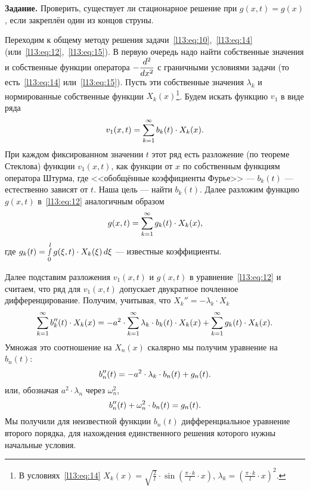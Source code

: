 \noindent\textbf{Задание.} Проверить, существует ли стационарное решение при $g(x,t)=g(x)$, если закреплён один из концов струны.
\vspace{0.2cm}

Переходим к общему методу решения задачи~\eqref{l13:eq:10},~\eqref{l13:eq:14} (или~\eqref{l13:eq:12},~\eqref{l13:eq:15}). В первую очередь надо найти собственные значения и собственные функции оператора $\displaystyle-\frac{d^2}{dx^2}$ с граничными условиями задачи (то есть~\eqref{l13:eq:14} или~\eqref{l13:eq:15}). Пусть эти собственные значения $\lambda_k$ и нормированные собственные функции $X_k(x)$\footnote{В условиях~\eqref{l13:eq:14} $\displaystyle X_k(x)=\sqrt{\frac{2}{l}}\cdot\sin\left(\frac{\pi\cdot k}{l}\cdot x\right)$, $\displaystyle\lambda_k=\left(\frac{\pi\cdot k}{l}\cdot x\right)^2$.}. Будем искать функцию $v_1$ в виде ряда
\begin{equation*}
	\hfill v_1(x,t)=\sum\limits_{k=1}^{\infty}b_k(t)\cdot X_k(x).\hfill
\end{equation*}
При каждом фиксированном значении $t$ этот ряд есть разложение (по теореме Стеклова) функции $v_1(x,t)$, как функции от $x$ по собственным функциям оператора Штурма, где <<обобщённые коэффициенты Фурье>> --- $b_k(t)$ --- естественно зависят от $t$. Наша цель --- найти $b_k(t)$. Далее разложим функцию $g(x,t)$ в~\eqref{l13:eq:12} аналогичным образом
\begin{equation*}
	\hfill g(x,t)=\sum\limits_{k=1}^{\infty}g_k(t)\cdot X_k(x),\hfill
\end{equation*}
где $\displaystyle g_k(t)=\smallint\limits_0^l g(\xi,t)\cdot X_k(\xi)\,d\xi$ --- известные коэффициенты.

Далее подставим разложения $v_1(x,t)$ и $g(x,t)$ в уравнение~\eqref{l13:eq:12} и считаем, что ряд для $v_1(x,t)$ допускает двукратное почленное дифференцирование. Получим, учитывая, что $X_k''=-\lambda_k\cdot X_k$
\begin{equation*}
	\hfill\sum\limits_{k=1}^{\infty}b_k''(t)\cdot X_k(x)=-a^2\cdot\sum\limits_{k=1}^{\infty} \lambda_k\cdot b_k(t)\cdot X_k(x)+\sum\limits_{k=1}^{\infty}g_k(t)\cdot X_k(x).\hfill
\end{equation*}
Умножая это соотношение на $X_n(x)$ скалярно мы получим уравнение на $b_n(t)$:
\begin{equation*}
	\hfill b_n''(t)=-a^2\cdot\lambda_k\cdot b_n(t)+g_n(t).\hfill
\end{equation*}
или, обозначая $a^2\cdot\lambda_n$ через $\omega_n^2$,
\begin{equation}\label{l13:eq:19}
	\hfill b_n''(t)+\omega_n^2\cdot b_n(t)=g_n(t).\hfill
\end{equation}
Мы получили для неизвестной функции $b_n(t)$ дифференциальное уравнение второго порядка, для нахождения единственного решения которого нужны начальные условия. 

